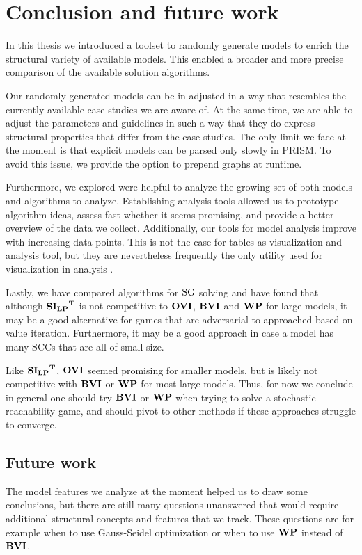 \chapter{Conclusion and future work} \label{ch:conclusion}
In this thesis we introduced a toolset to randomly generate models to enrich the structural variety of available models.
This enabled a broader and more precise comparison of the available solution algorithms.

Our randomly generated models can be in adjusted in a way that resembles the currently available case studies we are aware of.
At the same time, we are able to adjust the parameters and guidelines in such a way that they do express structural properties that differ from the case studies.
The only limit we face at the moment is that explicit models can be parsed only slowly in PRISM. 
To avoid this issue, we provide the option to prepend graphs at runtime.

Furthermore, we explored were helpful to analyze the growing set of both models and algorithms to analyze.
Establishing analysis tools allowed us to prototype algorithm ideas, assess fast whether it seems promising,
and provide a better overview of the data we collect. 
Additionally, our tools for model analysis improve with increasing data points.
This is not the case for tables as visualization and analysis tool, 
but they are nevertheless frequently the only utility used for visualization in analysis \cite{paperMaxi}\cite{widestPath}\cite{learningBased}.

Lastly, we have compared algorithms for $\textrm{SG}$ solving and have found that although $\mathbf{\mathbf{SI_{LP}}^T}$ is not competitive to $\mathbf{OVI}$, $\mathbf{BVI}$ and $\mathbf{WP}$ for large models,
it may be a good alternative for games that are adversarial to approached based on value iteration. 
Furthermore, it may be a good approach in case a model has many SCCs that are all of small size.

Like $\mathbf{\mathbf{SI_{LP}}^T}$, $\mathbf{OVI}$ seemed promising for smaller models, but is likely not competitive with $\mathbf{BVI}$ or $\mathbf{WP}$ for most large models.
Thus, for now we conclude in general one should try $\mathbf{BVI}$ or $\mathbf{WP}$ when trying to solve a stochastic reachability game, 
and should pivot to other methods if these approaches struggle to converge.

\section*{Future work}
The model features we analyze at the moment helped us to draw some conclusions, but there are still many questions unanswered that would require
additional structural concepts and features that we track.
These questions are for example when to use Gauss-Seidel optimization or when to use $\mathbf{WP}$ instead of $\mathbf{BVI}$.

